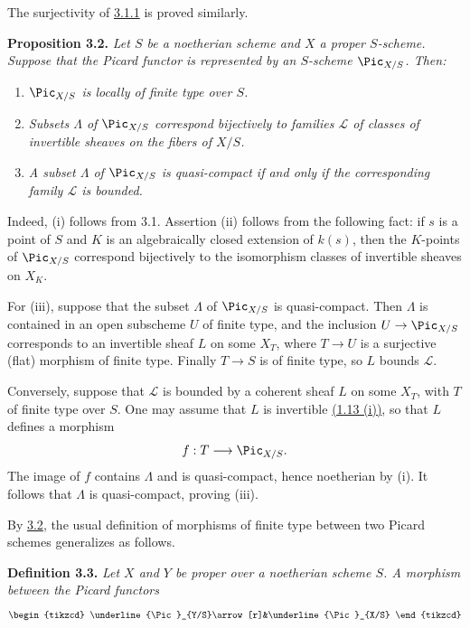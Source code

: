 The surjectivity of \hyperlink{sga6.e13.eq.3-1-1}{3.1.1} is proved similarly.

\textbf{Proposition 3.2.} \emph{Let \(S\) be a noetherian scheme and
\(X\) a proper \(S\)-scheme. Suppose that the Picard functor is
represented by an \(S\)-scheme \(\Pic_{X/S}\). Then:}
\begin{enumerate}[label=(\roman*)]
\item \emph{\(\Pic_{X/S}\) is locally of finite type over \(S\).}
\item \emph{Subsets \(\Lambda\) of \(\Pic_{X/S}\) correspond bijectively
to families \(\mathscr L\) of classes of invertible sheaves on the fibers
of \(X/S\).}
\item \emph{A subset \(\Lambda\) of \(\Pic_{X/S}\) is quasi-compact if
and only if the corresponding family \(\mathscr L\) is bounded.}
\end{enumerate}

Indeed, (i) follows from 3.1. Assertion (ii) follows from the following
fact: if \(s\) is a point of \(S\) and \(K\) is an algebraically closed
extension of \(k(s)\), then the \(K\)-points of \(\Pic_{X/S}\) correspond
bijectively to the isomorphism classes of invertible sheaves on \(X_K\).

For (iii), suppose that the subset \(\Lambda\) of \(\Pic_{X/S}\) is
quasi-compact. Then \(\Lambda\) is contained in an open subscheme \(U\)
of finite type, and the inclusion \(U\to\Pic_{X/S}\) corresponds to an
invertible sheaf \(L\) on some \(X_T\), where \(T\to U\) is a surjective
(flat) morphism of finite type. Finally \(T\to S\) is of finite type, so
\(L\) bounds \(\mathscr L\).

Conversely, suppose that \(\mathscr L\) is bounded by a coherent sheaf
\(L\) on some \(X_T\), with \(T\) of finite type over \(S\). One may
assume that \(L\) is invertible \hyperlink{sga6.e13.thm.1-13}{(1.13 (i))}, so that \(L\) defines a
morphism
\[
f:T\longrightarrow\Pic_{X/S}.
\]
The image of \(f\) contains \(\Lambda\) and is quasi-compact, hence
noetherian by (i). It follows that \(\Lambda\) is quasi-compact, proving
(iii).

By \hyperlink{sga6.e13.prop.3-2}{3.2}, the usual definition of morphisms of finite type between two
Picard schemes generalizes as follows.

\textbf{Definition 3.3.} \emph{Let \(X\) and \(Y\) be proper over a
noetherian scheme \(S\). A morphism between the Picard functors}
\[
\begin{tikzcd}
\underline{\Pic}_{Y/S}\arrow[r]&\underline{\Pic}_{X/S}
\end{tikzcd}
\]

